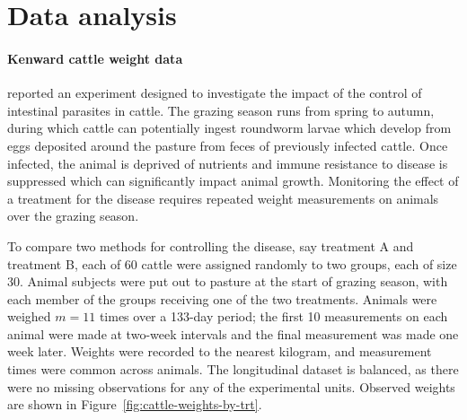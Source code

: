 
\chapter{Data analysis} \label{data-analysis-chapter}
\subsubsection{Kenward cattle weight data}

\cite{kenward1987method} reported an experiment designed to investigate the impact of the control of intestinal parasites in cattle. The grazing season runs from spring to autumn, during which cattle can potentially ingest roundworm larvae which develop from eggs deposited around the pasture from feces of previously infected cattle. Once infected, the animal is deprived of nutrients and immune resistance to disease is suppressed which can significantly impact animal growth. Monitoring the effect of a treatment for the disease requires repeated weight measurements on animals over the grazing season. 

\bigskip

To compare two methods for controlling the disease, say treatment A and treatment B, each of 60 cattle were assigned randomly to two groups, each of size 30. Animal subjects were put out to pasture at the start of grazing season, with each member of the groups receiving one of the two treatments. Animals were weighed $m = 11$ times over a 133-day period; the first 10 measurements on each animal were made at two-week intervals and the final measurement was made one week later. Weights were recorded to the nearest kilogram, and measurement times were common across animals. The longitudinal dataset is balanced, as there were no missing observations for any of the experimental units. Observed weights are shown in Figure~\ref{fig:cattle-weights-by-trt}.

